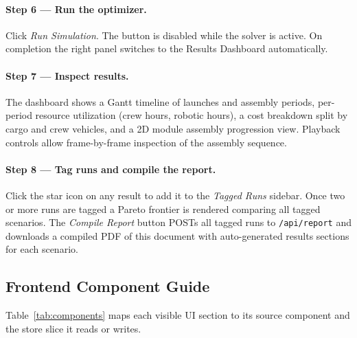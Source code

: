 \paragraph{Step 6 — Run the optimizer.}
Click \emph{Run Simulation}. The button is disabled while the
solver is active. On completion the right panel switches to the
Results Dashboard automatically.

\paragraph{Step 7 — Inspect results.}
The dashboard shows a Gantt timeline of launches and assembly
periods, per-period resource utilization (crew hours, robotic
hours), a cost breakdown split by cargo and crew vehicles, and a
2D module assembly progression view. Playback controls allow
frame-by-frame inspection of the assembly sequence.

\paragraph{Step 8 — Tag runs and compile the report.}
Click the star icon on any result to add it to the
\emph{Tagged Runs} sidebar. Once two or more runs are tagged a
Pareto frontier is rendered comparing all tagged scenarios.
The \emph{Compile Report} button POSTs all tagged runs to
\texttt{/api/report} and downloads a compiled PDF of this
document with auto-generated results sections for each scenario.

\subsection{Frontend Component Guide}

Table~\ref{tab:components} maps each visible UI section to its
source component and the store slice it reads or writes.

